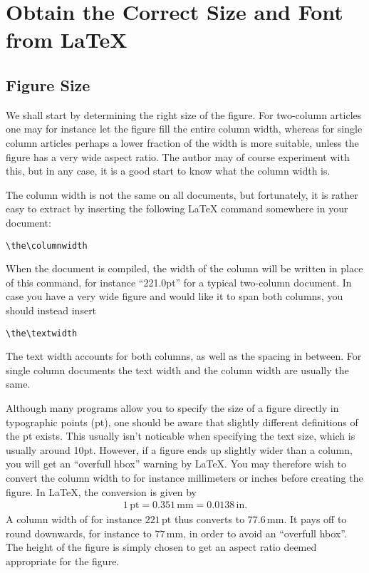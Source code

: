 \documentclass[12pt,a4paper]{article}
\begin{document}
\section{Obtain the Correct Size and Font from \LaTeX{}}

\subsection{Figure Size}
We shall start by determining the right size of the figure.
For two-column articles one may for instance let the figure fill the entire column width, whereas for single column articles perhaps a lower fraction of the width is more suitable, unless the figure has a very wide aspect ratio.
The author may of course experiment with this, but in any case, it is a good start to know what the column width is.

The column width is not the same on all documents, but fortunately, it is rather easy to extract by inserting the following \LaTeX{} command somewhere in your document:
\begin{verbatim}
\the\columnwidth
\end{verbatim}
When the document is compiled, the width of the column will be written in place of this command, for instance ``221.0pt'' for a typical two-column document. 
In case you have a very wide figure and would like it to span both columns, you should instead insert
\begin{verbatim}
\the\textwidth
\end{verbatim}
The text width accounts for both columns, as well as the spacing in between.
For single column documents the text width and the column width are usually the same.

Although many programs allow you to specify the size of a figure directly in typographic points (pt), one should be aware that slightly different definitions of the pt exists.
This usually isn't noticable when specifying the text size, which is usually around 10pt.
However, if a figure ends up slightly wider than a column, you will get an ``overfull hbox'' warning by \LaTeX{}.
You may therefore wish to convert the column width to for instance millimeters or inches before creating the figure.
In \LaTeX{}, the conversion is given by
\begin{align}
    1\,\mathrm{pt} = 0.351\,\mathrm{mm} = 0.0138\,\mathrm{in}.
\end{align}
A column width of for instance $221\,\mathrm{pt}$ thus converts to $77.6\,\mathrm{mm}$.
It pays off to round downwards, for instance to $77\,\mathrm{mm}$, in order to avoid an ``overfull hbox''.
The height of the figure is simply chosen to get an aspect ratio deemed appropriate for the figure.
\end{document}
